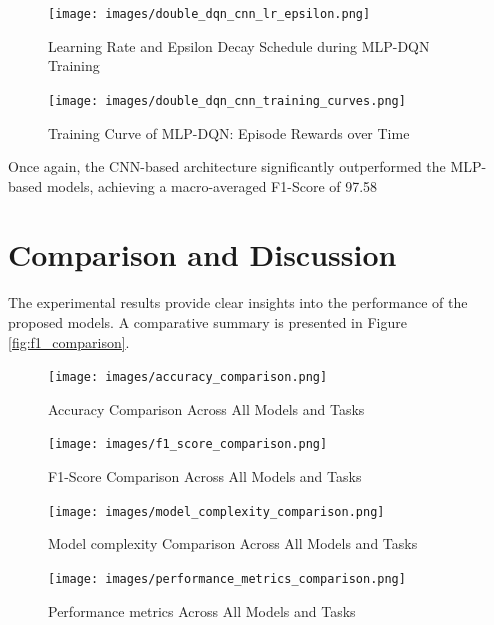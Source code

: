 \documentclass[16pt]{report}
\begin{document}
\begin{figure}[H]
    \centering
    \texttt{[image: images/double\_dqn\_cnn\_lr\_epsilon.png]}
    \caption{Learning Rate and Epsilon Decay Schedule during MLP-DQN Training}
    \label{fig:lr_epsilon}
\end{figure}

\begin{figure}[H]
    \centering
    \texttt{[image: images/double\_dqn\_cnn\_training\_curves.png]}
    \caption{Training Curve of MLP-DQN: Episode Rewards over Time}
    \label{fig:training_curve}
\end{figure}
\newpage
Once again, the CNN-based architecture significantly outperformed the MLP-based models, achieving a macro-averaged F1-Score of 97.58%

\section{Comparison and Discussion}
The experimental results provide clear insights into the performance of the proposed models. A comparative summary is presented in Figure \ref{fig:f1_comparison}.

\begin{figure}[H]
    \centering
    \texttt{[image: images/accuracy\_comparison.png]} %
    \caption{Accuracy Comparison Across All Models and Tasks}
    \label{fig:accuracy_comparison}
\end{figure}
\begin{figure}[H]
    \centering
    \texttt{[image: images/f1\_score\_comparison.png]} %
    \caption{F1-Score Comparison Across All Models and Tasks}
    \label{fig:accuracy_comparison}
\end{figure}
\begin{figure}[H]
    \centering
    \texttt{[image: images/model\_complexity\_comparison.png]} %
    \caption{Model complexity Comparison Across All Models and Tasks}
    \label{fig:model_complexity_comparison}
\end{figure}
\begin{figure}[H]
    \centering
    \texttt{[image: images/performance\_metrics\_comparison.png]} %
    \caption{Performance metrics Across All Models and Tasks}
    \label{fig:performance_metrics_comparison}
\end{figure}
\end{document}
